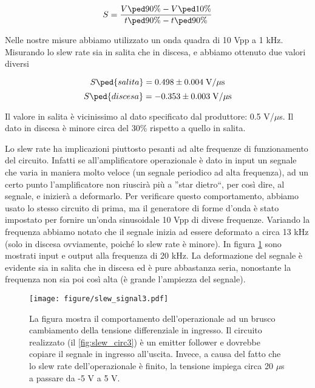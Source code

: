 \begin{equation}
    S = \frac{V\ped{90\%} - V\ped{10\%}}{t\ped{90\%} - t\ped{90\%}}
\end{equation}

Nelle nostre misure abbiamo utilizzato un onda quadra di 10 Vpp a 1 kHz.
Misurando lo slew rate sia in salita che in discesa, e abbiamo ottenuto
due valori diversi

\begin{equation}
    S\ped{salita} = 0.498 \pm 0.004 \; \text{V/$\mu$s}
\end{equation}
\begin{equation}
    S\ped{discesa} = -0.353 \pm 0.003 \; \text{V/$\mu$s}
\end{equation}

Il valore in salita è vicinissimo al dato specificato dal produttore: 0.5 V/$\mu$s.
Il dato in discesa è minore circa del 30\% rispetto a quello in salita.

Lo slew rate ha implicazioni piuttosto pesanti ad alte frequenze di funzionamento del circuito.
Infatti se all'amplificatore operazionale è dato in input un segnale che varia in maniera molto
veloce (un segnale periodico ad alta frequenza), ad un certo punto l'amplificatore non riuscirà
più a ''star dietro``, per così dire, al segnale, e inizierà a deformarlo. Per verificare questo
comportamento, abbiamo usato lo stesso circuito di prima, ma il generatore di forme d'onda è
stato impostato per fornire un'onda sinusoidale 10 Vpp di divese frequenze. Variando la frequenza
abbiamo notato che il segnale inizia ad essere deformato a circa 13 kHz (solo in discesa ovviamente,
poiché lo slew rate è minore). In figura \ref{fig:slew_signal3} sono mostrati input e output
alla frequenza di 20 kHz. La deformazione del segnale è evidente sia in salita che in discesa ed è
pure abbastanza seria, nonostante la frequenza non sia poi così alta (è grande l'ampiezza del segnale).

\begin{figure}[t]
    \texttt{[image: figure/slew\_signal3.pdf]}
    \caption{La figura mostra il comportamento dell'operazionale ad un brusco cambiamento della tensione
        differenziale in ingresso. Il circuito realizzato (il \ref{fig:slew_circ3}) è un emitter follower
        e dovrebbe copiare il segnale in ingresso all'uscita. Invece, a causa del fatto che lo slew rate
        dell'operazionale è finito, la tensione impiega circa 20 $\mu$s a passare da -5 V a 5 V.}
    \label{fig:slew_signal3}
\end{figure}

